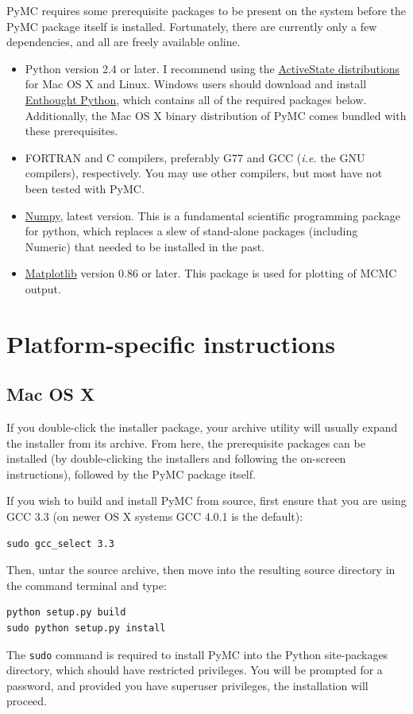 \documentclass[]{book}
\begin{document}
PyMC requires some prerequisite packages to be present on the system before the PyMC package itself is installed. Fortunately, there are currently only a few dependencies, and all are freely available online.
\begin{itemize}

\item Python version 2.4 or later. I recommend using the \href{http://www.activestate.com/Products/ActivePython/}{ActiveState distributions} for Mac OS X and Linux. Windows users should download and install \href{http://code.enthought.com/enthon/}{Enthought Python}, which contains all of the required packages below. Additionally, the Mac OS X binary distribution of PyMC comes bundled with these prerequisites.

\item FORTRAN and C compilers, preferably G77 and GCC (\emph{i.e.} the GNU compilers), respectively. You may use other compilers, but most have not been tested with PyMC.

\item \href{http://numeric.scipy.org/}{Numpy}, latest version. This is a fundamental scientific programming package for python, which replaces a slew of stand-alone packages (including Numeric) that needed to be installed in the past.

\item \href{http://matplotlib.sourceforge.net/}{Matplotlib} version 0.86 or later. This package is used for plotting of MCMC output.
\end{itemize}


\section{Platform-specific instructions}
\subsection{Mac OS X}

If you double-click the installer package, your archive utility will usually expand the installer from its archive. From here, the prerequisite packages can be installed (by double-clicking the installers and following the on-screen instructions), followed by the PyMC package itself.

If you wish to build and install PyMC from source, first ensure that you are using GCC 3.3 (on newer OS X systems GCC 4.0.1 is the default):
\begin{verbatim}
sudo gcc_select 3.3
\end{verbatim}
Then, untar the source archive, then move into the resulting source directory in the command terminal and type:
\begin{verbatim}
python setup.py build
sudo python setup.py install
\end{verbatim}
The \verb=sudo= command is required to install PyMC into the Python site-packages directory, which should have restricted privileges. You will be prompted for a password, and provided you have superuser privileges, the installation will proceed.
\end{document}
